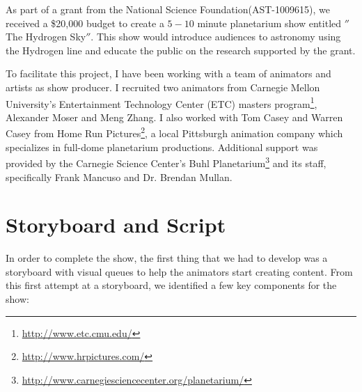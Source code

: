 As part of a grant from the National Science Foundation(AST-1009615), we received a \$20,000 budget to create a $5-10$ minute planetarium show entitled $''$The Hydrogen Sky$''$. This show would introduce audiences to astronomy using the \cm Hydrogen line and educate the public on the research supported by the grant. 

To facilitate this project, I have been working with a team of animators and artists as show producer. I recruited two animators from Carnegie Mellon University's Entertainment Technology Center (ETC) masters program\footnote{\url{http://www.etc.cmu.edu/}}, Alexander Moser and Meng Zhang. I also worked with Tom Casey and Warren Casey from Home Run Pictures\footnote{\url{http://www.hrpictures.com/}}, a local Pittsburgh animation company which specializes in full-dome planetarium productions. Additional support was provided by the Carnegie Science Center's Buhl Planetarium\footnote{\url{http://www.carnegiesciencecenter.org/planetarium/}} and its staff, specifically Frank Mancuso and Dr. Brendan Mullan.



\section{Storyboard and Script}

In order to complete the show, the first thing that we had to develop was a storyboard with visual queues to help the animators start creating content. From this first attempt at a storyboard, we identified a few key components for the show:

